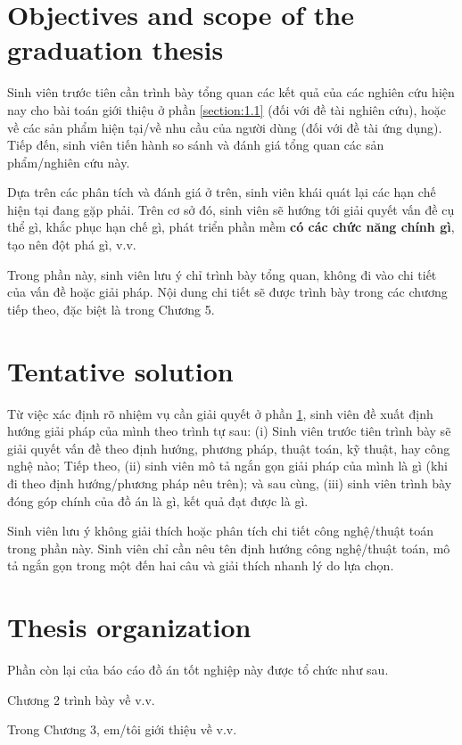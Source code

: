 \documentclass[../main.tex]{subfiles}
\begin{document}
\section{Objectives and scope of the graduation thesis}
\label{section:1.2}
Sinh viên trước tiên cần trình bày tổng quan các kết quả của các nghiên cứu hiện nay cho bài toán giới thiệu ở phần \ref{section:1.1} (đối với đề tài nghiên cứu), hoặc về các sản phẩm hiện tại/về nhu cầu của người dùng (đối với đề tài ứng dụng). Tiếp đến, sinh viên tiến hành so sánh và đánh giá tổng quan các sản phẩm/nghiên cứu này.

Dựa trên các phân tích và đánh giá ở trên, sinh viên khái quát lại các hạn chế hiện tại đang gặp phải. Trên cơ sở đó, sinh viên sẽ hướng tới giải quyết vấn đề cụ thể gì, khắc phục hạn chế gì, phát triển phần mềm \textbf{có các chức năng chính gì}, tạo nên đột phá gì, v.v.

Trong phần này, sinh viên lưu ý chỉ trình bày tổng quan, không đi vào chi tiết của vấn đề hoặc giải pháp. Nội dung chi tiết sẽ được trình bày trong các chương tiếp theo, đặc biệt là trong Chương 5.

\section{Tentative solution}
\label{section:1.3}
Từ việc xác định rõ nhiệm vụ cần giải quyết ở phần \ref{section:1.2}, sinh viên đề xuất định hướng giải pháp của mình theo trình tự sau: (i) Sinh viên trước tiên trình bày sẽ giải quyết vấn đề theo định hướng, phương pháp, thuật toán, kỹ thuật, hay công nghệ nào; Tiếp theo, (ii) sinh viên mô tả ngắn gọn giải pháp của mình là gì (khi đi theo định hướng/phương pháp nêu trên); và sau cùng, (iii) sinh viên trình bày đóng góp chính của đồ án là gì, kết quả đạt được là gì.

Sinh viên lưu ý không giải thích hoặc phân tích chi tiết công nghệ/thuật toán trong phần này. Sinh viên chỉ cần nêu tên định hướng công nghệ/thuật toán, mô tả ngắn gọn trong một đến hai câu và giải thích nhanh lý do lựa chọn.

\section{Thesis organization}
\label{section:1.4}
Phần còn lại của báo cáo đồ án tốt nghiệp này được tổ chức như sau. 

Chương 2 trình bày về v.v. 

Trong Chương 3, em/tôi giới thiệu về v.v.
\end{document}
